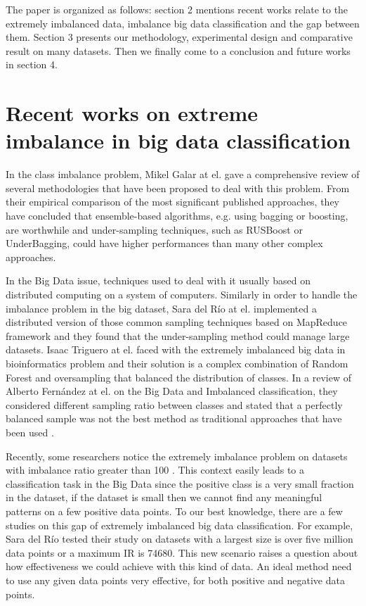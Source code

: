 The paper is organized as follows: section 2 mentions recent works relate to the extremely imbalanced data, imbalance big data classification and the gap between them. Section 3 presents our methodology, experimental design and comparative result on many datasets. Then we finally come to a conclusion and future works in section 4.


\section{Recent works on extreme imbalance in big data classification}

In the class imbalance problem, Mikel Galar at el. \cite{galar2012review} gave a comprehensive review of several methodologies that have been proposed to deal with this problem. From their empirical comparison of the most significant published approaches, they have concluded that ensemble-based algorithms, e.g. using bagging or boosting, are worthwhile and under-sampling techniques, such as RUSBoost or UnderBagging,  could have higher performances than many other complex approaches.

In the Big Data issue, techniques used to deal with it usually based on distributed computing on a system of computers. Similarly in order to handle the imbalance problem in the big dataset, Sara del Río at el. \cite{del2014use} implemented a distributed version of those common sampling techniques based on MapReduce framework \cite{miner2012mapreduce} and they found that the under-sampling method could manage large datasets. Isaac Triguero at el. \cite{triguero2015rosefw} faced with the extremely imbalanced big data in bioinformatics problem and their solution is a complex combination of Random Forest \cite{breiman2001random} and oversampling that balanced the distribution of classes. In a review of Alberto Fernández at el. \cite{fernandez2017insight} on the Big Data and Imbalanced classification, they considered different sampling ratio between classes and stated that a perfectly balanced sample was not the best method as traditional approaches that have been used \cite{hido2009roughly, garcia2009evolutionary}.

Recently, some researchers notice the extremely imbalance problem on datasets with imbalance ratio greater than 100 \cite{tang2009svms, triguero2015rosefw}. This context easily leads to a classification task in the Big Data since the positive class is a very small fraction in the dataset, if the dataset is small then we cannot find any meaningful patterns on a few positive data points. To our best knowledge, there are a few studies on this gap of extremely imbalanced big data classification. For example, Sara del Río \cite{del2014use} tested their study on datasets with a largest size is over five million data points or a maximum IR is 74680. This new scenario raises a question about how effectiveness we could achieve with this kind of data. An ideal method need to use any given data points very effective, for both positive and negative data points.

